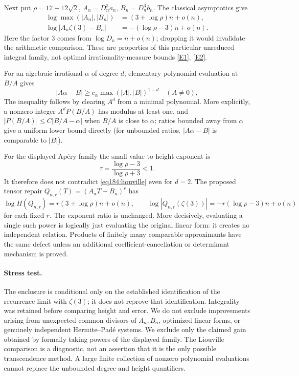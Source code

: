\documentclass[11pt,a4paper]{article}
\newcommand{\eref}[2]{\hyperlink{extra:#1:#2}{[E#2]}}
\numberwithin{equation}{section}
\begin{document}
Next put $\rho=17+12\sqrt2$, $A_n=D_n^3a_n$, $B_n=D_n^3b_n$. The classical asymptotics give
\begin{align*}
 \log\max(|A_n|,|B_n|)&=(3+\log\rho)n+o(n),\\
 \log|A_n\zeta(3)-B_n|&=-(\log\rho-3)n+o(n).
\end{align*}
Here the factor $3$ comes from $\log D_n=n+o(n)$; dropping it would invalidate the arithmetic comparison. These are properties of this particular unreduced integral family, not optimal irrationality-measure bounds \eref{1283}{1}, \eref{1283}{2}.

For an algebraic irrational $\alpha$ of degree $d$, elementary polynomial evaluation at $B/A$ gives
\begin{equation}\label{eq184:liouville}
 |A\alpha-B|\ge c_\alpha\max(|A|,|B|)^{1-d}
 \quad(A\ne0),
\end{equation}
The inequality follows by clearing $A^d$ from a minimal polynomial. More explicitly, a nonzero integer $A^dP(B/A)$ has modulus at least one, and $|P(B/A)|\le C|B/A-\alpha|$ when $B/A$ is close to $\alpha$; ratios bounded away from $\alpha$ give a uniform lower bound directly (for unbounded ratios, $|A\alpha-B|$ is comparable to $|B|$).

For the displayed Ap\'ery family the small-value-to-height exponent is
\[
 \tau=\frac{\log\rho-3}{\log\rho+3}<1.
\]
It therefore does not contradict \eqref{eq184:liouville} even for $d=2$. The proposed tensor repair $Q_{n,r}(T)=(A_nT-B_n)^r$ has
\[
 \log H(Q_{n,r})=r(3+\log\rho)n+o(n),\qquad
 \log|Q_{n,r}(\zeta(3))|=-r(\log\rho-3)n+o(n)
\]
for each fixed $r$. The exponent ratio is unchanged. More decisively, evaluating a single such power is logically just evaluating the original linear form: it creates no independent relation. Products of finitely many comparable approximants have the same defect unless an additional coefficient-cancellation or determinant mechanism is proved.

\paragraph{Stress test.}
The enclosure is conditional only on the established identification of the recurrence limit with $\zeta(3)$; it does not reprove that identification. Integrality was retained before comparing height and error. We do not exclude improvements arising from unexpected common divisors of $A_n,B_n$, optimized linear forms, or genuinely independent Hermite--Pad\'e systems. We exclude only the claimed gain obtained by formally taking powers of the displayed family. The Liouville comparison is a diagnostic, not an assertion that it is the only possible transcendence method. A large finite collection of nonzero polynomial evaluations cannot replace the unbounded degree and height quantifiers.
\end{document}
